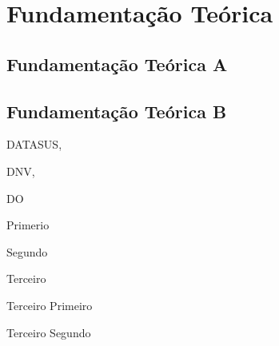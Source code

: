 \chapter{Fundamentação Teórica}
\label{cap:fundamentacao-teorica}


\section{Fundamentação Teórica A}
\label{sec:fundamentacao-teorica-a}



\section{Fundamentação Teórica B}
\label{sec:fundamentacao-teorica-b}



	
\acrlong{DATASUS},

\acrlong{DNV},

\acrlong{DO}

\begin{alineascomponto}
	\item Primerio
	\item Segundo
	\item Terceiro
	\begin{subalineascomponto}
		\item Terceiro Primeiro
		\item Terceiro Segundo
	\end{subalineascomponto}
\end{alineascomponto}